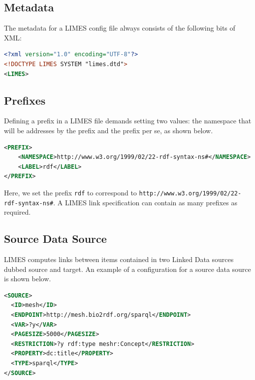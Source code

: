\documentclass[a4paper, 11pt]{article}
\begin{document}
\subsection{Metadata}
The metadata for a LIMES config file always consists of the following bits of XML:

\begin{ttfamily}
\begin{lstlisting}[language=XML,basicstyle=\scriptsize,numberstyle=\tiny]
<?xml version="1.0" encoding="UTF-8"?>
<!DOCTYPE LIMES SYSTEM "limes.dtd">
<LIMES>
\end{lstlisting}
\end{ttfamily}

\subsection{Prefixes}
Defining a prefix in a LIMES file demands setting two values: the namespace that will be addresses by the prefix and the prefix per se, as shown below.
\begin{ttfamily}
\begin{lstlisting}[language=XML,basicstyle=\scriptsize,numberstyle=\tiny]
<PREFIX>
    <NAMESPACE>http://www.w3.org/1999/02/22-rdf-syntax-ns#</NAMESPACE>
    <LABEL>rdf</LABEL>
</PREFIX>
\end{lstlisting}
\end{ttfamily}
Here, we set the prefix \texttt{rdf} to correspond to \texttt{http://www.w3.org/1999/02/22-rdf-syntax-ns\#}. A LIMES link specification can contain as many prefixes as required.

\subsection{Source Data Source}
LIMES computes links between items contained in two Linked Data sources dubbed source and target. An example of a configuration for a source data source is shown below.
\begin{ttfamily}
\begin{lstlisting}[language=XML,basicstyle=\scriptsize,numberstyle=\tiny]
<SOURCE>
  <ID>mesh</ID>
  <ENDPOINT>http://mesh.bio2rdf.org/sparql</ENDPOINT>
  <VAR>?y</VAR>
  <PAGESIZE>5000</PAGESIZE>
  <RESTRICTION>?y rdf:type meshr:Concept</RESTRICTION>
  <PROPERTY>dc:title</PROPERTY>
  <TYPE>sparql</TYPE>
</SOURCE>
\end{lstlisting}
\end{ttfamily}
\end{document}
